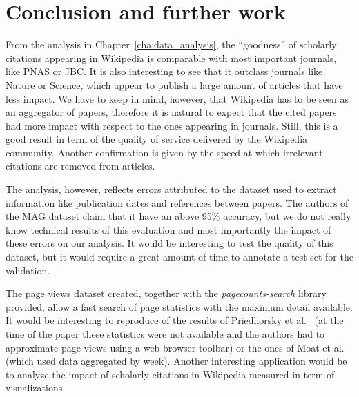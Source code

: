 \cleardoublepage{}
\chapter{Conclusion and further work}
\label{cha:conclusion}
From the analysis in Chapter~\ref{cha:data_analysis}, the ``goodness'' of scholarly citations appearing in Wikipedia is comparable with most important journals, like PNAS or JBC.
It is also interesting to see that it outclass journals like Nature or Science, which appear to publish a large amount of articles that have less impact.
We have to keep in mind, however, that Wikipedia has to be seen as an aggregator of papers, therefore it is natural to expect that the cited papers had more impact with respect to the ones appearing in journals.
Still, this is a good result in term of the quality of service delivered by the Wikipedia community.
Another confirmation is given by the speed at which irrelevant citations are removed from articles.

The analysis, however, reflects errors attributed to the dataset used to extract information like publication dates and references between papers.
The authors of the \ac{MAG} dataset claim that it have an above 95\% accuracy, but we do not really know technical results of this evaluation and most importantly the impact of these errors on our analysis.
It would be interesting to test the quality of this dataset, but it would require a great amount of time to annotate a test set for the validation.

The page views dataset created, together with the \emph{pagecounts-search} library provided, allow a fast search of page statistics with the maximum detail available.
It would be interesting to reproduce of the results of Priedhorsky et al.~\cite{Priedhorsky2007} (at the time of the paper these statistics were not available and the authors had to approximate page views using a web browser toolbar)
or the ones of Moat et al.~\cite{Moat2013} (which used data aggregated by week).
Another interesting application would be to analyze the impact of scholarly citations in Wikipedia measured in term of visualizations.

